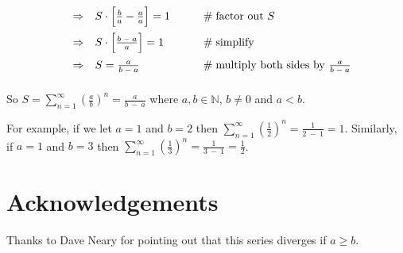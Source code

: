 \documentclass[11pt, oneside]{article}   	%
\begin{document}
\begin{equation*}
\begin{array}{lllll}
\vspace{2.0mm}
&\Rightarrow&  S \cdot \Big [\frac{b}{a}  - \frac{a}{a} \Big ] = 1                                                                                                 &\qquad  \mathrel{\#} \text{factor out $S$}                                              \\
\vspace{2.0mm}
&\Rightarrow& S \cdot \Big [ \frac{b \:-\: a} {a} \Big ] = 1                                                                                                           &\qquad  \mathrel{\#} \text{simplify}                                                         \\ 
\vspace{2.0mm} 
&\Rightarrow& S  = \frac{a}{b \:-\: a}                                                                                                                                        &\qquad  \mathrel{\#} \text{multiply both sides by $ \frac{a}{b \:-\: a} $}
\end{array}
\end{equation*}

\bigskip
\noindent
So $S = \sum\limits_{n = 1}^\infty (\frac{a}{b})^n  =  \frac{a}{b \:-\: a}$ where $a,b \in \mathbb{N}$, $b \neq 0$ and $a < b$.  

\bigskip
\noindent
For example, if we  let $a =1$ and $b =2$ then $\sum\limits_{n = 1}^\infty (\frac{1}{2})^n  =  \frac{1}{2 \:-\: 1} = 1$. Similarly, if $a =1$ and $b = 3$ then 
$\sum\limits_{n = 1}^\infty (\frac{1}{3})^n  =  \frac{1}{3 \:-\: 1} = \frac{1}{2}$. 

\bigskip
\noindent
\section*{Acknowledgements}

Thanks to Dave Neary for pointing out that this series diverges if $a \geq b$.
\end{document}
